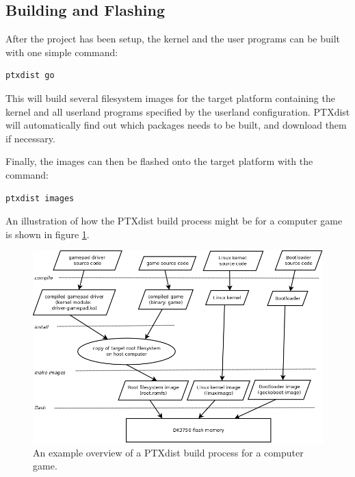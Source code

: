 \subsection{Building and Flashing}
After the project has been setup, the kernel and the user programs can be built with one simple command:
\lstset{style=lststyle-terminal}
\begin{lstlisting}
ptxdist go
\end{lstlisting}
This will build several filesystem images for the target platform containing the kernel and all userland programs specified by the userland configuration. PTXdist will automatically find out which packages needs to be built, and download them if necessary.

Finally, the images can then be flashed onto the target platform with the command:
\begin{lstlisting}
ptxdist images
\end{lstlisting}
An illustration of how the PTXdist build process might be for a computer game is shown in figure \ref{fig:ptxdist-build-process}.

\begin{figure}[ht]\label{fig:ptxdist-build-process}
  \includegraphics[width=\textwidth]{images/ptxdist_build_process.png}
  \caption{An example overview of a PTXdist build process for a computer game.}
\end{figure}

